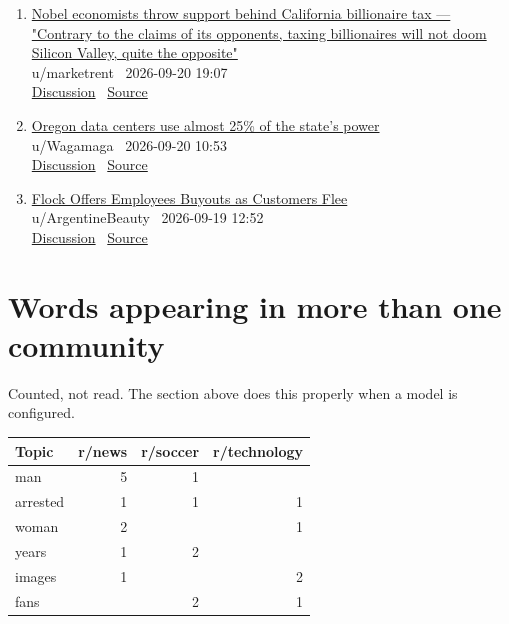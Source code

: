 \documentclass[11pt,a4paper]{article}
\newcommand{\radartop}{\toprule}
\newcommand{\radarmid}{\midrule}
\newcommand{\radarbottom}{\bottomrule}
\newcommand{\radartop}{\hline}
\newcommand{\radarmid}{\hline}
\newcommand{\radarbottom}{\hline}
\begin{document}
\begin{enumerate}
  \item \href{https://www.reddit.com/r/technology/comments/1wlpst4/nobel_economists_throw_support_behind_california/}{Nobel economists throw support behind California billionaire tax --- "Contrary to the claims of its opponents, taxing billionaires will not doom Silicon Valley, quite the opposite"}\\ {\small u/marketrent \textbullet\ 2026-09-20 19:07}\\ {\small \href{https://www.reddit.com/r/technology/comments/1wlpst4/nobel_economists_throw_support_behind_california/}{Discussion} \textbullet\ \href{https://www.ft.com/content/94ec0fee-53ab-4d7e-9b17-6b05608ad974}{Source}}
  \item \href{https://www.reddit.com/r/technology/comments/1wldygn/oregon_data_centers_use_almost_25_of_the_states/}{Oregon data centers use almost 25\% of the state's power}\\ {\small u/Wagamaga \textbullet\ 2026-09-20 10:53}\\ {\small \href{https://www.reddit.com/r/technology/comments/1wldygn/oregon_data_centers_use_almost_25_of_the_states/}{Discussion} \textbullet\ \href{https://mashable.com/tech/oregon-data-center-power-consumption-report}{Source}}
  \item \href{https://www.reddit.com/r/technology/comments/1wklgz3/flock_offers_employees_buyouts_as_customers_flee/}{Flock Offers Employees Buyouts as Customers Flee}\\ {\small u/ArgentineBeauty \textbullet\ 2026-09-19 12:52}\\ {\small \href{https://www.reddit.com/r/technology/comments/1wklgz3/flock_offers_employees_buyouts_as_customers_flee/}{Discussion} \textbullet\ \href{https://www.wired.com/story/flock-is-offering-voluntary-buyouts-to-employees/}{Source}}
\end{enumerate}
\section*{Words appearing in more than one community}
{\small Counted, not read. The section above does this properly when a model is configured.}\par
\vspace{8pt}
\noindent
\begin{tabular}{lrrr}
\radartop
\textbf{Topic} & \textbf{r/news} & \textbf{r/soccer} & \textbf{r/technology} \\
\radarmid
man & 5 & 1 &  \\
arrested & 1 & 1 & 1 \\
woman & 2 &  & 1 \\
years & 1 & 2 &  \\
images & 1 &  & 2 \\
fans &  & 2 & 1 \\
\radarbottom
\end{tabular}
\end{document}
